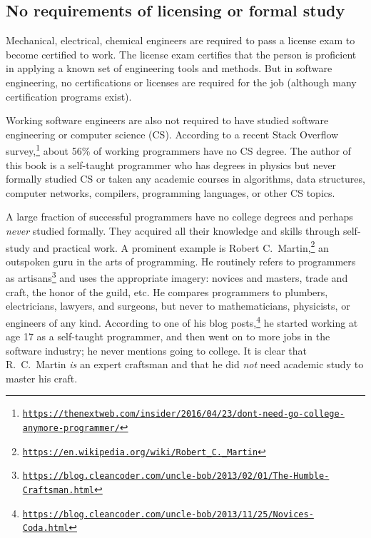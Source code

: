 \subsection{No requirements of licensing or formal study}

Mechanical, electrical, chemical engineers are required to pass a
license exam to become certified to work. The license exam certifies
that the person is proficient in applying a known set of engineering
tools and methods. But in software engineering, no certifications
or licenses are required for the job (although many certification
programs exist).

Working software engineers are also not required to have studied software
engineering or computer science (CS). According to a recent Stack
Overflow survey,\footnote{\texttt{\href{https://thenextweb.com/insider/2016/04/23/dont-need-go-college-anymore-programmer/}{https://thenextweb.com/insider/2016/04/23/dont-need-go-college-anymore-programmer/}}}
about 56\% of working programmers have no CS degree. The author of
this book is a self-taught programmer who has degrees in physics but
never formally studied CS or taken any academic courses in algorithms,
data structures, computer networks, compilers, programming languages,
or other CS topics. 

A large fraction of successful programmers have no college degrees
and perhaps \emph{never} studied formally. They acquired all their
knowledge and skills through self-study and practical work. A prominent
example is Robert C.~Martin,\footnote{\texttt{\href{https://en.wikipedia.org/wiki/Robert_C._Martin}{https://en.wikipedia.org/wiki/Robert\_C.\_Martin}}}
an outspoken guru in the arts of programming. He routinely refers
to programmers as artisans\footnote{\texttt{\href{https://blog.cleancoder.com/uncle-bob/2013/02/01/The-Humble-Craftsman.html}{https://blog.cleancoder.com/uncle-bob/2013/02/01/The-Humble-Craftsman.html}}}
and uses the appropriate imagery: novices and masters, trade and craft,
the honor of the guild, etc. He compares programmers to plumbers,
electricians, lawyers, and surgeons, but never to mathematicians,
physicists, or engineers of any kind. According to one of his blog
posts,\footnote{\texttt{\href{https://blog.cleancoder.com/uncle-bob/2013/11/25/Novices-Coda.html}{https://blog.cleancoder.com/uncle-bob/2013/11/25/Novices-Coda.html}}}
he started working at age 17 as a self-taught programmer, and then
went on to more jobs in the software industry; he never mentions going
to college. It is clear that R.~C.~Martin \emph{is} an expert craftsman
and that he did \emph{not} need academic study to master his craft.

